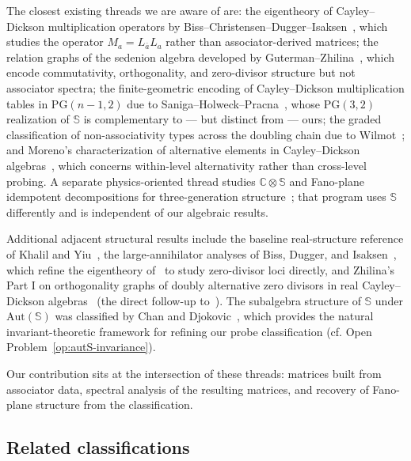 \documentclass[12pt,a4paper]{article}
\begin{document}
The closest existing threads we are aware of are: the eigentheory of Cayley--Dickson multiplication operators by Biss--Christensen--Dugger--Isaksen~\cite{biss2009}, which studies the operator $M_a = L_{\bar a} L_a$ rather than associator-derived matrices; the relation graphs of the sedenion algebra developed by Guterman--Zhilina~\cite{guterman_zhilina2021}, which encode commutativity, orthogonality, and zero-divisor structure but not associator spectra; the finite-geometric encoding of Cayley--Dickson multiplication tables in $\mathrm{PG}(n-1,2)$ due to Saniga--Holweck--Pracna~\cite{saniga2015}, whose $\mathrm{PG}(3,2)$ realization of $\mathbb{S}$ is complementary to --- but distinct from --- ours; the graded classification of non-associativity types across the doubling chain due to Wilmot~\cite{wilmot2025structure}; and Moreno's characterization of alternative elements in Cayley--Dickson algebras~\cite{moreno2004}, which concerns within-level alternativity rather than cross-level probing. A separate physics-oriented thread studies $\mathbb{C} \otimes \mathbb{S}$ and Fano-plane idempotent decompositions for three-generation structure~\cite{gresnigt2019, gresnigt2023, gourlay_gresnigt2024}; that program uses $\mathbb{S}$ differently and is independent of our algebraic results.

Additional adjacent structural results include the baseline real-structure reference of Khalil and Yiu~\cite{khalil_yiu1997}, the large-annihilator analyses of Biss, Dugger, and Isaksen~\cite{biss_dugger_isaksen2008, biss_dugger_isaksen2007}, which refine the eigentheory of~\cite{biss2009} to study zero-divisor loci directly, and Zhilina's Part I on orthogonality graphs of doubly alternative zero divisors in real Cayley--Dickson algebras~\cite{zhilina2021} (the direct follow-up to~\cite{guterman_zhilina2021}). The subalgebra structure of $\mathbb{S}$ under $\mathrm{Aut}(\mathbb{S})$ was classified by Chan and Djokovic~\cite{chan_dokovic2006}, which provides the natural invariant-theoretic framework for refining our probe classification (cf. Open Problem~\ref{op:autS-invariance}).

Our contribution sits at the intersection of these threads: matrices built from associator data, spectral analysis of the resulting matrices, and recovery of Fano-plane structure from the classification.

\subsection{Related classifications}
\label{sec:related-classifications}
\end{document}
